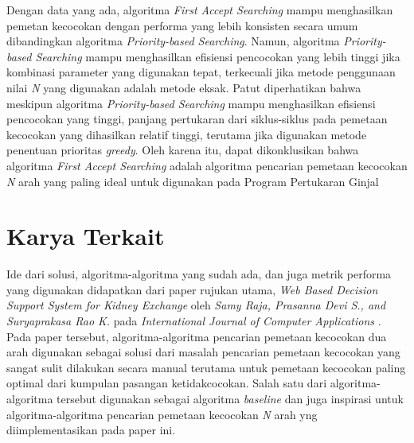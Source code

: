 \documentclass[conference]{IEEEtran}
\begin{document}
Dengan data yang ada, algoritma \textit{First Accept Searching} mampu menghasilkan pemetan kecocokan dengan performa yang lebih konsisten
secara umum dibandingkan algoritma \textit{Priority-based Searching}. Namun, algoritma \textit{Priority-based Searching} mampu menghasilkan
efisiensi pencocokan yang lebih tinggi jika kombinasi parameter yang digunakan tepat, terkecuali jika metode penggunaan nilai \textit{N} yang digunakan
adalah metode eksak. Patut diperhatikan bahwa meskipun algoritma \textit{Priority-based Searching} mampu menghasilkan efisiensi pencocokan
yang tinggi, panjang pertukaran dari siklus-siklus pada pemetaan kecocokan yang dihasilkan relatif tinggi, terutama jika digunakan metode
penentuan prioritas \textit{greedy}. Oleh karena itu, dapat dikonklusikan bahwa algoritma \textit{First Accept Searching} adalah algoritma
pencarian pemetaan kecocokan \textit{N} arah yang paling ideal untuk digunakan pada Program Pertukaran Ginjal

\section{Karya Terkait}
Ide dari solusi, algoritma-algoritma yang sudah ada, dan juga metrik performa yang digunakan didapatkan dari paper rujukan utama,
\textit{Web Based Decision Support System for Kidney Exchange} oleh \textit{Samy Raja, Prasanna Devi S., and Suryaprakasa Rao K.} pada
\textit{International Journal of Computer Applications} \cite{raja}. Pada paper tersebut, algoritma-algoritma pencarian pemetaan
kecocokan dua arah digunakan sebagai solusi dari masalah pencarian pemetaan kecocokan yang sangat sulit dilakukan secara manual
terutama untuk pemetaan kecocokan paling optimal dari kumpulan pasangan ketidakcocokan. Salah satu dari algoritma-algoritma tersebut
digunakan sebagai algoritma \textit{baseline} dan juga inspirasi untuk algoritma-algoritma pencarian pemetaan kecocokan \textit{N}
arah yng diimplementasikan pada paper ini.
\end{document}
